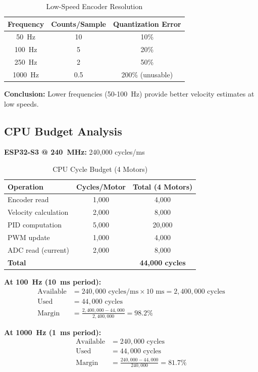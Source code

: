 \begin{table}[H]
\centering
\caption{Low-Speed Encoder Resolution}
\begin{tabular}{ccc}
\toprule
\textbf{Frequency} & \textbf{Counts/Sample} & \textbf{Quantization Error} \\
\midrule
50~Hz & 10 & 10\% \\
100~Hz & 5 & 20\% \\
250~Hz & 2 & 50\% \\
1000~Hz & 0.5 & 200\% (unusable) \\
\bottomrule
\end{tabular}
\end{table}

\textbf{Conclusion:} Lower frequencies (50-100~Hz) provide better velocity estimates at low speeds.

\subsection{CPU Budget Analysis}

\textbf{ESP32-S3 @ 240~MHz:} 240,000 cycles/ms

\begin{table}[H]
\centering
\caption{CPU Cycle Budget (4 Motors)}
\begin{tabular}{lcc}
\toprule
\textbf{Operation} & \textbf{Cycles/Motor} & \textbf{Total (4 Motors)} \\
\midrule
Encoder read & 1,000 & 4,000 \\
Velocity calculation & 2,000 & 8,000 \\
PID computation & 5,000 & 20,000 \\
PWM update & 1,000 & 4,000 \\
ADC read (current) & 2,000 & 8,000 \\
\midrule
\textbf{Total} & & \textbf{44,000 cycles} \\
\bottomrule
\end{tabular}
\end{table}

\textbf{At 100~Hz (10~ms period):}
\begin{align}
\text{Available} &= 240,000 \text{ cycles/ms} \times 10 \text{ ms} = 2,400,000 \text{ cycles} \\
\text{Used} &= 44,000 \text{ cycles} \\
\text{Margin} &= \frac{2,400,000 - 44,000}{2,400,000} = 98.2\%
\end{align}

\textbf{At 1000~Hz (1~ms period):}
\begin{align}
\text{Available} &= 240,000 \text{ cycles} \\
\text{Used} &= 44,000 \text{ cycles} \\
\text{Margin} &= \frac{240,000 - 44,000}{240,000} = 81.7\%
\end{align}

